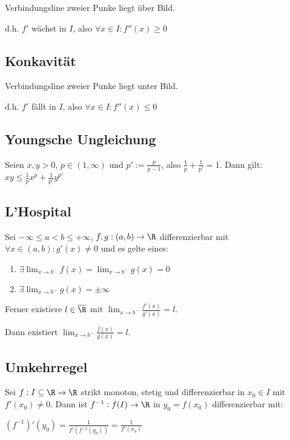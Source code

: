Verbindungsline zweier Punke liegt über Bild.

d.h. $f'$ wächst in $I$, also $\forall x \in I : f''(x) \geq 0$

\subsection*{Konkavität}

Verbindungsline zweier Punke liegt unter Bild.

d.h. $f'$ fällt in $I$, also $\forall x \in I : f''(x) \leq 0$

\subsection*{Youngsche Ungleichung}

Seien $x, y > 0$, $p \in (1, \infty)$ und $p' := \frac{p}{p-1}$, also $\frac{1}{p}+\frac{1}{p'}=1$. Dann gilt: $xy \leq \frac{1}{p}x^p + \frac{1}{p'}y^{p'}$

\subsection*{L'Hospital}

Sei $-\infty \leq a < b \leq +\infty$, $f, g : (a, b) \rightarrow \R$ differenzierbar mit $\forall x \in (a, b) : g'(x) \neq 0$ und es gelte eines:

\begin{enumerate}[label=(\alph*)]
	\item $\exists \lim_{x \to b^-} f(x) = \lim_{x \to b^-} g(x) = 0$
	\item $\exists \lim_{x \to b^-} g(x) = \pm \infty$
\end{enumerate}

Ferner existiere $l \in \overline{\R}$ mit $\lim_{x \to b^-} \frac{f'(x)}{g'(x)} = l$.

Dann existiert $\lim_{x \to b^-} \frac{f(x)}{g(x)} = l$.

\subsection*{Umkehrregel}

Sei $f : I \subseteq \R \to \R$ strikt monoton, stetig und differenzierbar in $x_0 \in I$ mit $f'(x_0) \neq 0$. Dann ist $f^{-1} : f(I) \to \R$ in $y_0 = f(x_0)$ differenzierbar mit:

$(f^{-1})'(y_0) = \frac{1}{f'(f^{-1}(y_0))} = \frac{1}{f'(x_0)}$

